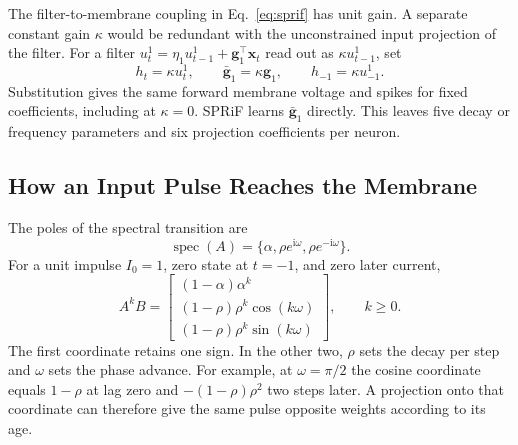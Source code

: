 \documentclass[letterpaper,journal]{IEEEtran}
\DeclareMathOperator{\spec}{spec}
\begin{document}
The filter-to-membrane coupling in Eq.~\eqref{eq:sprif} has unit gain. A separate constant gain $\kappa$ would be redundant with the unconstrained input projection of the filter. For a filter $u_t^1=\eta_1u_{t-1}^1+\mathbf g_1^\top\mathbf x_t$ read out as $\kappa u_{t-1}^1$, set
\begin{equation}
h_t=\kappa u_t^1,\qquad
\bar{\mathbf g}_1=\kappa\mathbf g_1,\qquad
h_{-1}=\kappa u_{-1}^1 .
\label{eq:absorption}
\end{equation}
Substitution gives the same forward membrane voltage and spikes for fixed coefficients, including at $\kappa=0$. SPRiF learns $\bar{\mathbf g}_1$ directly. This leaves five decay or frequency parameters and six projection coefficients per neuron.

\subsection{How an Input Pulse Reaches the Membrane}
\label{sec:kernels}

The poles of the spectral transition are
\begin{equation}
\spec(A)=\{\alpha,\rho e^{\mathrm i\omega},
                       \rho e^{-\mathrm i\omega}\}.
\label{eq:poles}
\end{equation}
For a unit impulse $I_0=1$, zero state at $t=-1$, and zero later current,
\begin{equation}
A^kB=
\begin{bmatrix}
(1-\alpha)\alpha^k\\
(1-\rho)\rho^k\cos(k\omega)\\
(1-\rho)\rho^k\sin(k\omega)
\end{bmatrix},\qquad k\geq0.
\label{eq:impulse}
\end{equation}
The first coordinate retains one sign. In the other two, $\rho$ sets the decay per step and $\omega$ sets the phase advance. For example, at $\omega=\pi/2$ the cosine coordinate equals $1-\rho$ at lag zero and $-(1-\rho)\rho^2$ two steps later. A projection onto that coordinate can therefore give the same pulse opposite weights according to its age.
\end{document}
